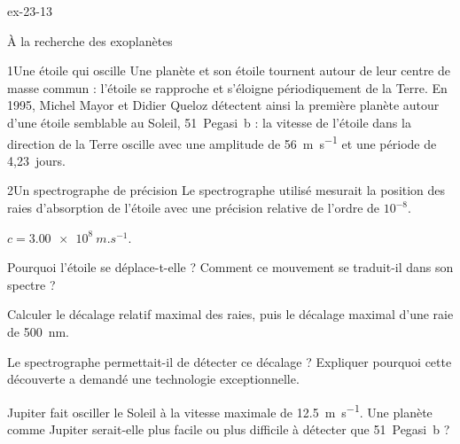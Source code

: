 \begin{blocLivre}{ex-23-13}
\begin{exercice}[3]{À la recherche des exoplanètes}
\begin{docu}{1}{Une étoile qui oscille}
Une planète et son étoile tournent autour de leur centre de masse commun : l'étoile se rapproche et s'éloigne
périodiquement de la Terre. En 1995, Michel Mayor et Didier Queloz détectent ainsi la première planète autour d'une
étoile semblable au Soleil, 51~Pegasi~b : la vitesse de l'étoile dans la direction de la Terre oscille avec une amplitude
de \qty{56}{m.s^{-1}} et une période de 4,23~jours.
\end{docu}
\begin{docu}{2}{Un spectrographe de précision}
Le spectrographe utilisé mesurait la position des raies d'absorption de l'étoile avec une précision relative de l'ordre
de $10^{-8}$.
\end{docu}
\begin{donnees}
$c=\qty{3,00e8}{m.s^{-1}}$.
\end{donnees}
\begin{questions}
\item Pourquoi l'étoile se déplace-t-elle ? Comment ce mouvement se traduit-il dans son spectre ?
\item Calculer le décalage relatif maximal des raies, puis le décalage maximal d'une raie de \qty{500}{nm}.
\item \initiative Le spectrographe permettait-il de détecter ce décalage ? Expliquer pourquoi cette découverte a demandé
une technologie exceptionnelle.
\item Jupiter fait osciller le Soleil à la vitesse maximale de \qty{12,5}{m.s^{-1}}. Une planète comme Jupiter serait-elle plus
facile ou plus difficile à détecter que 51~Pegasi~b ?
\end{questions}
\end{exercice}
\end{blocLivre}
